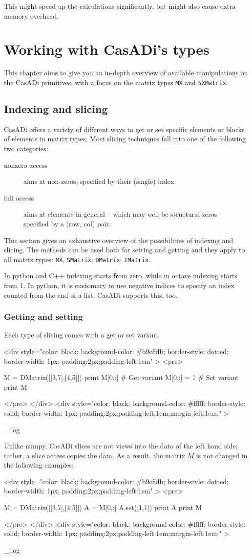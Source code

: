 \documentclass[a4paper,12pt]{book}
\newcounter{pytexcount}
\newcounter{pytexsubcount}
\newcommand{\pytexStart}[1]{
  \addtocounter{pytexcount}{1}%
  \setcounter{pytexsubcount}{0}%
}
\renewenvironment{pytex}
{\addtocounter{pytexsubcount}{1}%
\begin{rawhtml}
<div style="color: black; background-color: \#b9c8db;  border-style: dotted; border-width: 1px; padding:2px;padding-left:1em" >
<pre>
\end{rawhtml}
}%
{\begin{rawhtml}
</pre>
</div>
<div style="color: black; background-color: \#fffff;  border-style: solid; border-width: 1px; padding:2px;padding-left:1em;margin-left:1em;" >\end{rawhtml}
_\arabic{pytexsubcount}.log}%
\begin{rawhtml}
</div>
\end{rawhtml}
}
\begin{document}
{This might speed up the calculations significantly, but might also cause extra memory overhead.

\chapter{Working with CasADi's types}

This chapter aims to give you an in-depth overview of available manipulations on the CasADi primitives, with a focus on the matrix types \texttt{MX} and \texttt{SXMatrix}.

\section{Indexing and slicing}
CasADi offers a variety of different ways to get or set specific elements or blocks of elements in matrix types. Most slicing techniques fall into one of the following two categories:

\begin{description}
\item[nonzero access] aims at non-zeros, specified by their (single) index 
\item[full access] aims at elements in general -- which may well be structural zeros --  specified by a (row, col) pair.
\end{description}

This section gives an exhaustive overview of the possibilities of indexing and slicing. The methods can be used both for setting and getting and they apply to all matrix types: \texttt{MX}, \texttt{SMatrix}, \texttt{DMatrix}, \texttt{IMatrix}.

In python and C++ indexing starts from zero, while in octave indexing starts from 1.
In python, it is customary to use negative indices to specify an index counted from the end of a list. CasADi supports this, too.

\subsection{Getting and setting}

\pytexStart{main}

Each type of slicing comes with a get or set variant.
\begin{pytex}
M = DMatrix([[3,7],[4,5]])
print M[0,:]  # Get variant
M[0,:] = 1    # Set variant
print M
\end{pytex}

Unlike numpy, CasADi slices are not views into the data of the left hand side; rather, a slice access copies the data. As a result, the matrix $M$ is not changed in the following examples: 
\begin{pytex}
M = DMatrix([[3,7],[4,5]])
A = M[0,:]
A.set([1,1])
print A
print M
\end{pytex}

}
\end{document}

